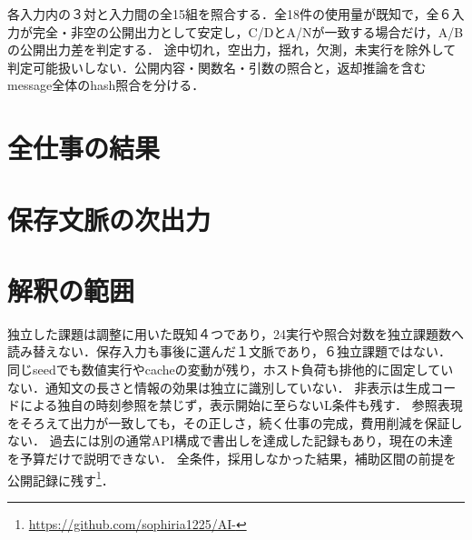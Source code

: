 \documentclass[uplatex,a4paper,twocolumn,10pt]{jsarticle}
\begin{document}
各入力内の３対と入力間の全15組を照合する．全18件の使用量が既知で，全６入力が完全・非空の公開出力として安定し，C/DとA/Nが一致する場合だけ，A/Bの公開出力差を判定する．
途中切れ，空出力，揺れ，欠測，未実行を除外して判定可能扱いしない．公開内容・関数名・引数の照合と，返却推論を含むmessage全体のhash照合を分ける．

\section{全仕事の結果}



\section{保存文脈の次出力}


\section{解釈の範囲}
独立した課題は調整に用いた既知４つであり，24実行や照合対数を独立課題数へ読み替えない．保存入力も事後に選んだ１文脈であり，６独立課題ではない．
同じseedでも数値実行やcacheの変動が残り，ホスト負荷も排他的に固定していない．通知文の長さと情報の効果は独立に識別していない．
非表示は生成コードによる独自の時刻参照を禁じず，表示開始に至らないL条件も残す．
参照表現をそろえて出力が一致しても，その正しさ，続く仕事の完成，費用削減を保証しない．
過去には別の通常API構成で書出しを達成した記録もあり，現在の未達を予算だけで説明できない．
全条件，採用しなかった結果，補助区間の前提を公開記録に残す\footnote{\url{https://github.com/sophiria1225/AI-}}．
\end{document}
